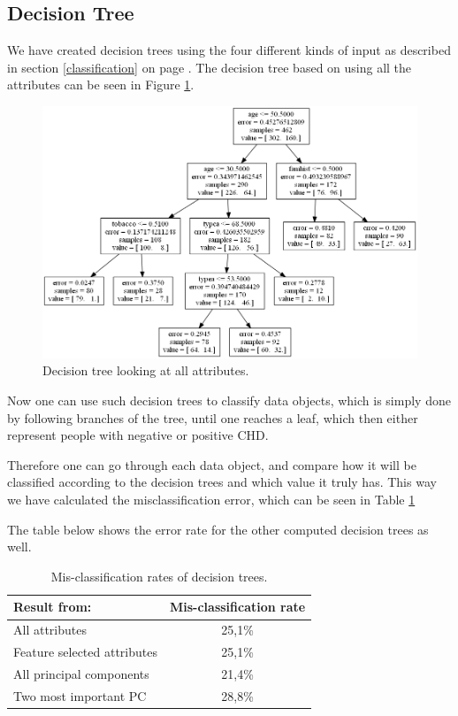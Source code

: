 \subsection{Decision Tree}

We have created decision trees using the four different kinds of input as described in section \ref{classification} on page \pageref{classification}. The decision tree based on using all the attributes can be seen in Figure \ref{decisionTreeX}.%

\begin{figure}[H]
\center
	\includegraphics[scale=0.25]{pictures/Decision_Tree_X.png}
	\caption{Decision tree looking at all attributes.}
	\label{decisionTreeX}
\end{figure}

Now one can use such decision trees to classify data objects, which is simply done by following branches of the tree, until one reaches a leaf, which then either represent people with negative or positive CHD.

Therefore one can go through each data object, and compare how it will be classified according to the decision trees and which value it truly has. This way we have calculated the misclassification error, which can be seen in Table \ref{decisionTreeErrorRate}

The table below shows the error rate for the other computed decision trees as well.%
\begin{table}[H]
\begin{longtable}{lc}\hline
Result from: & Mis-classification rate \\ \hline
All attributes & 25,1\% \\ 
Feature selected attributes & 25,1\% \\ 
All principal components & 21,4\% \\ 
Two most important PC & 28,8\% \\ \hline
\end{longtable}
\caption{Mis-classification rates of decision trees.}
\label{decisionTreeErrorRate}
\end{table}

